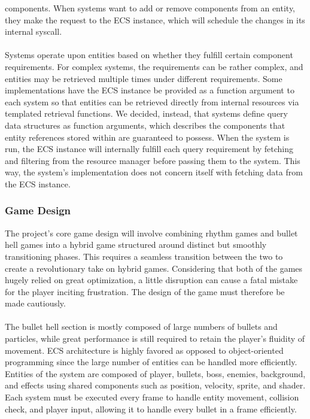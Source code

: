 components.
When systems want to add or remove components from an entity, they make the request to the ECS instance, which
will schedule the changes in its internal syscall.
\\\\
Systems operate upon entities based on whether they fulfill certain component requirements.
For complex systems, the requirements can be rather complex, and entities may be retrieved multiple times
under different requirements.
Some implementations have the ECS instance be provided as a function argument to each system so that entities
can be retrieved directly from internal resources via templated retrieval functions.
We decided, instead, that systems define query data structures as function arguments, which describes the components
that entity references stored within are guaranteed to possess.
When the system is run, the ECS instance will internally fulfill each query requirement by fetching and filtering
from the resource manager before passing them to the system.
This way, the system's implementation does not concern itself with fetching data from the ECS instance.

\subsubsection*{Game Design}

The project's core game design will involve combining rhythm games and bullet hell games into a hybrid game
structured around distinct but smoothly transitioning phases.
This requires a seamless transition between the two to create a revolutionary take on hybrid games.
Considering that both of the games hugely relied on great optimization, a little disruption can cause a fatal mistake for
the player inciting frustration.
The design of the game must therefore be made cautiously.
\\\\
\noindent The bullet hell section is mostly composed of large numbers of bullets and particles,
while great performance is still required to retain the player’s fluidity of movement.
ECS architecture is highly favored as opposed to object-oriented programming since the
large number of entities can be handled more efficiently.
Entities of the system are composed of player, bullets, boss, enemies, background, and effects
using shared components such as position, velocity, sprite, and shader.
Each system must be executed every frame to handle entity movement,
collision check, and player input, allowing it to handle every bullet in a frame efficiently.


